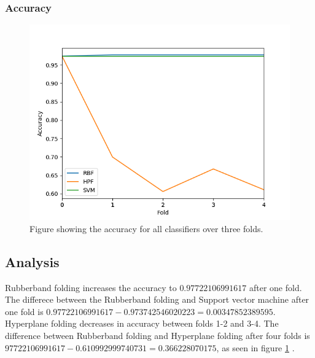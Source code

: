 \documentclass[a4paper,twoside]{bth}
\begin{document}
\subsubsection{Accuracy}
\begin{figure}[!htb]
\centering
\includegraphics[scale=0.7]{images/result-cancer/Accuracy.png}
   \caption{Figure showing the accuracy for all classifiers over three folds.}
   \label{fig:cancer-accuracy}
\end{figure}

\FloatBarrier
\subsection{Analysis} 
Rubberband folding increases the accuracy to $0.97722106991617$ after one fold. The differece between the Rubberband folding and Support vector machine after one fold is $0.97722106991617 - 0.973742546020223 = 0.00347852389595$. Hyperplane folding decreases in accuracy between folds 1-2 and 3-4. The difference between Rubberband folding and Hyperplane folding after four folds is $97722106991617 - 0.610992999740731 = 0.366228070175$, as seen in figure \ref{fig:cancer-accuracy}
.
\clearpage
\FloatBarrier
\end{document}

